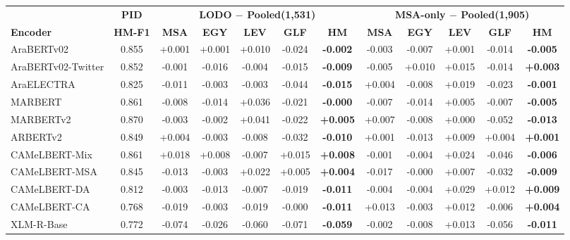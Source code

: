 \begin{tabular}{lc|ccccc|ccccc}
\toprule
 & \textbf{PID} & \multicolumn{5}{c|}{\textbf{LODO $-$ Pooled(1,531)}} & \multicolumn{5}{c}{\textbf{MSA-only $-$ Pooled(1,905)}} \\
\textbf{Encoder} & \textbf{HM-F1} & \textbf{MSA} & \textbf{EGY} & \textbf{LEV} & \textbf{GLF} & \textbf{HM} & \textbf{MSA} & \textbf{EGY} & \textbf{LEV} & \textbf{GLF} & \textbf{HM} \\
\midrule
AraBERTv02 & 0.855 & +0.001 & +0.001 & +0.010 & -0.024 & \textbf{-0.002} & -0.003 & -0.007 & +0.001 & -0.014 & \textbf{-0.005} \\
AraBERTv02-Twitter & 0.852 & -0.001 & -0.016 & -0.004 & -0.015 & \textbf{-0.009} & -0.005 & +0.010 & +0.015 & -0.014 & \textbf{+0.003} \\
AraELECTRA & 0.825 & -0.011 & -0.003 & -0.003 & -0.044 & \textbf{-0.015} & +0.004 & -0.008 & +0.019 & -0.023 & \textbf{-0.001} \\
MARBERT & 0.861 & -0.008 & -0.014 & +0.036 & -0.021 & \textbf{-0.000} & -0.007 & -0.014 & +0.005 & -0.007 & \textbf{-0.005} \\
MARBERTv2 & 0.870 & -0.003 & -0.002 & +0.041 & -0.022 & \textbf{+0.005} & +0.007 & -0.008 & +0.000 & -0.052 & \textbf{-0.013} \\
ARBERTv2 & 0.849 & +0.004 & -0.003 & -0.008 & -0.032 & \textbf{-0.010} & +0.001 & -0.013 & +0.009 & +0.004 & \textbf{+0.001} \\
CAMeLBERT-Mix & 0.861 & +0.018 & +0.008 & -0.007 & +0.015 & \textbf{+0.008} & -0.001 & -0.004 & +0.024 & -0.046 & \textbf{-0.006} \\
CAMeLBERT-MSA & 0.845 & -0.013 & -0.003 & +0.022 & +0.005 & \textbf{+0.004} & -0.017 & -0.000 & +0.007 & -0.032 & \textbf{-0.009} \\
CAMeLBERT-DA & 0.812 & -0.003 & -0.013 & -0.007 & -0.019 & \textbf{-0.011} & -0.004 & -0.004 & +0.029 & +0.012 & \textbf{+0.009} \\
CAMeLBERT-CA & 0.768 & -0.019 & -0.003 & -0.019 & -0.000 & \textbf{-0.011} & +0.013 & -0.003 & +0.012 & -0.006 & \textbf{+0.004} \\
XLM-R-Base & 0.772 & -0.074 & -0.026 & -0.060 & -0.071 & \textbf{-0.059} & -0.002 & -0.008 & +0.013 & -0.056 & \textbf{-0.011} \\
\bottomrule
\end{tabular}
